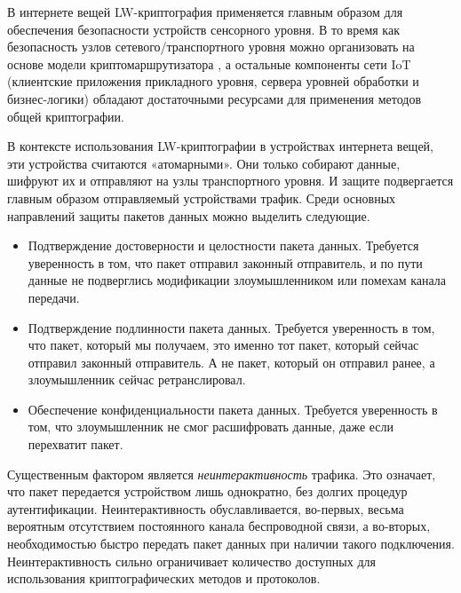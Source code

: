 В интернете вещей LW-криптография применяется главным образом для обеспечения безопасности устройств сенсорного уровня. В то время как безопасность узлов сетевого/транспортного уровня можно организовать на основе модели криптомаршрутизатора \cite{src23}, а остальные компоненты сети IoT (клиентские приложения прикладного уровня, сервера уровней обработки и бизнес-логики) обладают достаточными ресурсами для применения методов общей криптографии.

В контексте использования LW-криптографии в устройствах интернета вещей, эти устройства считаются «атомарными». Они только собирают данные, шифруют их и отправляют на узлы транспортного уровня. И защите подвергается главным образом отправляемый устройствами трафик. Среди основных направлений защиты пакетов данных можно выделить следующие.
\begin{itemize}
	\item Подтверждение достоверности и целостности пакета данных. Требуется уверенность в том, что пакет отправил законный отправитель, и по пути данные не подверглись модификации злоумышленником или помехам канала передачи.
	\item Подтверждение подлинности пакета данных. Требуется уверенность в том, что пакет, который мы получаем, это именно тот пакет, который сейчас отправил законный отправитель. А не пакет, который он отправил ранее, а злоумышленник сейчас ретранслировал.
	\item Обеспечение конфиденциальности пакета данных. Требуется уверенность в том, что злоумышленник не смог расшифровать данные, даже если перехватит пакет.
\end{itemize}

Существенным фактором является \textit{неинтерактивность} трафика. Это означает, что пакет передается устройством лишь однократно, без долгих процедур аутентификации. Неинтерактивность обуславливается, во-первых, весьма вероятным отсутствием постоянного канала беспроводной связи, а во-вторых, необходимостью быстро передать пакет данных при наличии такого подключения. Неинтерактивность сильно ограничивает количество доступных для использования криптографических методов и протоколов.

